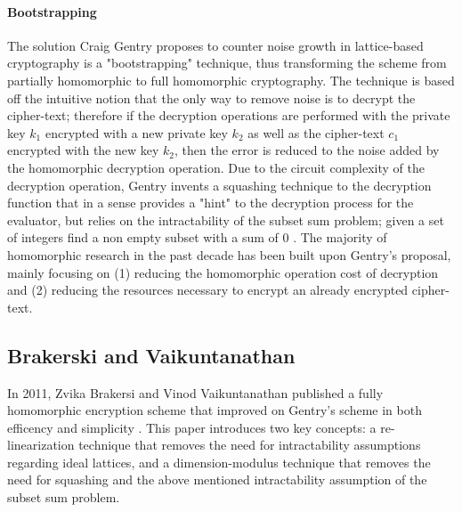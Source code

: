 \documentclass[10pt, a4paper]{article}
\begin{document}
	
	\paragraph{Bootstrapping}
	The solution Craig Gentry proposes to counter noise growth in lattice-based cryptography is a "bootstrapping" technique, thus transforming the scheme from partially homomorphic to full homomorphic cryptography. The technique is based off the intuitive notion that the only way to remove noise is to decrypt the cipher-text; therefore if the decryption operations are performed with the private key $k_1$ encrypted with a new private key $k_2$ as well as the cipher-text $c_1$ encrypted with the new key $k_2$, then the error is reduced to the noise added by the homomorphic decryption operation. Due to the circuit complexity of the decryption operation, Gentry invents a squashing technique to the decryption function that in a sense provides a "hint" to the decryption process for the evaluator, but relies on the intractability of the subset sum problem; given a set of integers find a non empty subset with a sum of 0 \cite{gentry2009fully}. The majority of homomorphic research in the past decade has been built upon Gentry's proposal, mainly focusing on (1) reducing the homomorphic operation cost of decryption and (2) reducing the resources necessary to encrypt an already encrypted cipher-text.

	\subsection{Brakerski and Vaikuntanathan}
	In 2011, Zvika Brakersi and Vinod Vaikuntanathan published a fully homomorphic encryption scheme that improved on Gentry's scheme in both efficency and simplicity \cite{brakerski2014efficient}. This paper introduces two key concepts: a re-linearization technique that removes the need for intractability assumptions regarding ideal lattices, and a dimension-modulus technique that removes the need for squashing and the above mentioned intractability assumption of the subset sum problem. 
\end{document}
